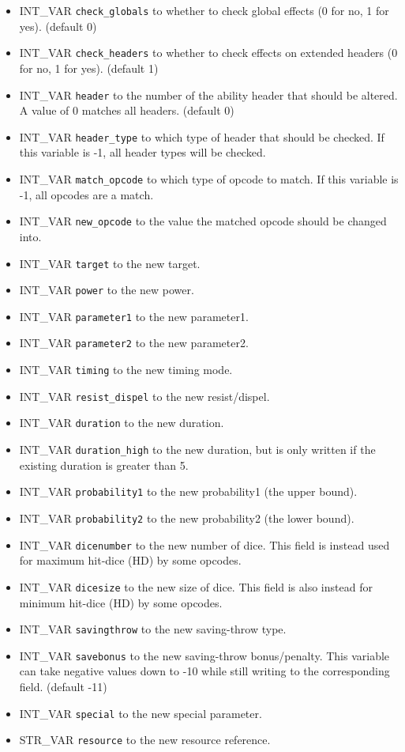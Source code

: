 \documentclass{article}
\begin{document}
\begin{itemize}
\item INT_VAR \verb+check_globals+ to whether to check global effects (0 for no, 1 for yes). (default 0)
\item INT_VAR \verb+check_headers+ to whether to check effects on extended headers (0 for no, 1 for yes). (default 1)
\item INT_VAR \verb+header+ to the number of the ability header that should be altered. A value of 0 matches all headers. (default 0)
\item INT_VAR \verb+header_type+ to which type of header that should be checked. If this variable is -1, all header types will be checked.
\item INT_VAR \verb+match_opcode+ to which type of opcode to match. If this variable is -1, all opcodes are a match.
\item INT_VAR \verb+new_opcode+ to the value the matched opcode should be changed into.
\item INT_VAR \verb+target+ to the new target.
\item INT_VAR \verb+power+ to the new power.
\item INT_VAR \verb+parameter1+ to the new parameter1.
\item INT_VAR \verb+parameter2+ to the new parameter2.
\item INT_VAR \verb+timing+ to the new timing mode.
\item INT_VAR \verb+resist_dispel+ to the new resist/dispel.
\item INT_VAR \verb+duration+ to the new duration.
\item INT_VAR \verb+duration_high+ to the new duration, but is only written if the existing duration is greater than 5.
\item INT_VAR \verb+probability1+ to the new probability1 (the upper bound).
\item INT_VAR \verb+probability2+ to the new probability2 (the lower bound).
\item INT_VAR \verb+dicenumber+ to the new number of dice. This field is instead used for maximum hit-dice (HD) by some opcodes.
\item INT_VAR \verb+dicesize+ to the new size of dice. This field is also instead for minimum hit-dice (HD) by some opcodes.
\item INT_VAR \verb+savingthrow+ to the new saving-throw type.
\item INT_VAR \verb+savebonus+ to the new saving-throw bonus/penalty. This variable can take negative values down to -10 while still writing to the corresponding field. (default -11)
\item INT_VAR \verb+special+ to the new special parameter.
\item STR_VAR \verb+resource+ to the new resource reference.
\end{itemize}
\\
\end{document}
